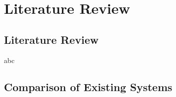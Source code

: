 
\chapter{Literature Review} %
\label{Chapter2}


\section{Literature Review}
abc \cite{evans2003write}
\section{Comparison of Existing Systems}



